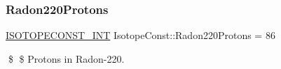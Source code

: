 \subsubsection{\texorpdfstring{Radon220\+Protons}{Radon220Protons}}
{\footnotesize\ttfamily \mbox{\hyperlink{group___isotope_const-_macros_ga5f18360b3e99483a35c32d789e62621c}{I\+S\+O\+T\+O\+P\+E\+C\+O\+N\+S\+T\+\_\+\+I\+NT}} Isotope\+Const\+::\+Radon220\+Protons = 86}

\$ \$ Protons in Radon-\/220. 